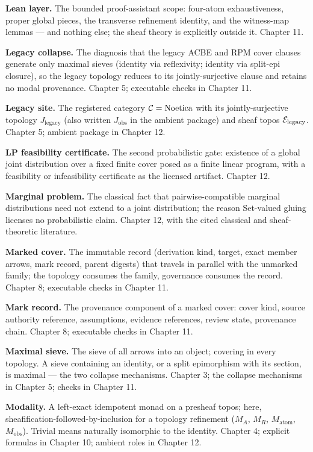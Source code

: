 \textbf{Lean layer.} The bounded proof-assistant scope: four-atom
exhaustiveness, proper global pieces, the transverse refinement
identity, and the witness-map lemmas --- and nothing else; the sheaf
theory is explicitly outside it. Chapter 11.

\textbf{Legacy collapse.} The diagnosis that the legacy ACBE and RPM
cover clauses generate only maximal sieves (identity via reflexivity;
identity via split-epi closure), so the legacy topology reduces to
its jointly-surjective clause and retains no modal provenance.
Chapter 5; executable checks in Chapter 11.

\textbf{Legacy site.} The registered category
$\mathcal{C} = \mathrm{Noetica}$ with its jointly-surjective topology
$J_{\mathrm{legacy}}$ (also written $J_{\mathrm{obs}}$ in the ambient
package) and sheaf topos $\mathcal{E}_{\mathrm{legacy}}$. Chapter 5; ambient package in
Chapter 12.

\textbf{LP feasibility certificate.} The second probabilistic gate:
existence of a global joint distribution over a fixed finite cover
posed as a finite linear program, with a feasibility or infeasibility
certificate as the licensed artifact. Chapter 12.

\textbf{Marginal problem.} The classical fact that
pairwise-compatible marginal distributions need not extend to a joint
distribution; the reason Set-valued gluing licenses no probabilistic
claim. Chapter 12, with the cited classical and sheaf-theoretic
literature.

\textbf{Marked cover.} The immutable record (derivation kind, target,
exact member arrows, mark record, parent digests) that travels in
parallel with the unmarked family; the topology consumes the family,
governance consumes the record. Chapter 8; executable checks in
Chapter 11.

\textbf{Mark record.} The provenance component of a marked cover:
cover kind, source authority reference, assumptions, evidence
references, review state, provenance chain. Chapter 8; executable
checks in Chapter 11.

\textbf{Maximal sieve.} The sieve of all arrows into an object;
covering in every topology. A sieve containing an identity, or a
split epimorphism with its section, is maximal --- the two collapse
mechanisms. Chapter 3; the collapse mechanisms in Chapter 5; checks in
Chapter 11.

\textbf{Modality.} A left-exact idempotent monad on a presheaf topos;
here, sheafification-followed-by-inclusion for a topology refinement
($M_A$, $M_R$, $M_{\mathrm{atom}}$, $M_{\mathrm{obs}}$). Trivial
means naturally isomorphic to the identity. Chapter 4; explicit
formulas in Chapter 10; ambient roles in Chapter 12.

